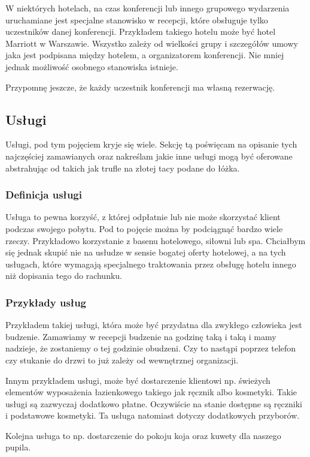 \documentclass[a4paper,onecolumn,oneside,11pt,wide,floatssmall]{mwrep}
\theoremstyle{definition}
\theoremstyle{plain}%
\theoremstyle{remark}
\begin{document}
W niektórych hotelach, na czas konferencji lub innego grupowego wydarzenia
uruchamiane jest specjalne stanowisko w recepcji, które obsługuje tylko
uczestników danej konferencji. Przykładem takiego hotelu może być hotel Marriott
w Warszawie. Wszystko zależy od wielkości grupy i szczegółów umowy jaka jest
podpisana między hotelem, a organizatorem konferencji. Nie mniej jednak
możliwość osobnego stanowiska istnieje. 

Przypomnę jeszcze, że każdy uczestnik konferencji ma własną rezerwację.

\subsection{Usługi}
Usługi, pod tym pojęciem kryje się wiele. Sekcję tą poświęcam na opisanie tych
najczęściej zamawianych oraz nakreślam jakie inne usługi mogą być oferowane
abstrahując od takich jak trufle na złotej tacy podane do łóżka.

\subsubsection{Definicja usługi}
Usługa to pewna korzyść, z której odpłatnie lub nie może skorzystać klient
podczas swojego pobytu. Pod to pojęcie można by podciągnąć bardzo wiele rzeczy.
Przykładowo korzystanie z basenu hotelowego, siłowni lub spa. Chciałbym się
jednak skupić nie na usłudze w sensie bogatej oferty hotelowej, a na tych
usługach, które wymagają specjalnego traktowania przez obsługę hotelu innego niż
dopisania tego do rachunku.
\subsubsection{Przykłady usług}
Przykładem takiej usługi, która może być przydatna dla zwykłego człowieka jest
budzenie. Zamawiamy w recepcji budzenie na godzinę taką i taką i mamy nadzieje,
że zostaniemy o tej godzinie obudzeni. Czy to nastąpi poprzez telefon czy
stukanie do drzwi to już zależy od wewnętrznej organizacji.

Innym przykładem usługi, może być dostarczenie klientowi np. świeżych elementów
wyposażenia łazienkowego takiego jak ręcznik albo kosmetyki. Takie usługi są
zazwyczaj dodatkowo płatne. Oczywiście na stanie dostępne są ręczniki i
podstawowe kosmetyki. Ta usługa natomiast dotyczy dodatkowych przyborów.

Kolejna usługa to np. dostarczenie do pokoju koja oraz kuwety dla naszego
pupila.
\end{document}
